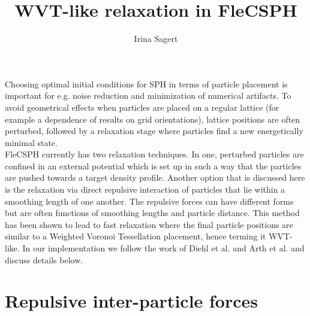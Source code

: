 \documentclass{article}
\begin{document}
\title{WVT-like relaxation in FleCSPH}
\author{Irina Sagert}

\maketitle

Choosing optimal initial conditions for SPH in terms of particle placement is important for e.g. noise reduction and minimization of numerical artifacts. 
To avoid geometrical effects when particles are placed on a regular lattice (for example a dependence of results on grid orientations), lattice positions are often perturbed, followed by a relaxation stage where particles find a new energetically minimal state. \\
FleCSPH currently has two relaxation techniques. 
In one, perturbed particles are confined in an external potential which is set up in such a way that the particles are pushed towards a target density profile.  
Another option that is discussed here is the relaxation via direct repulsive interaction of particles that lie within a smoothing length of one another. 
The repulsive forces can have different forms but are often functions of smoothing lengths and particle distance. 
This method has been shown to lead to fast relaxation where the final particle positions are similar to a  Weighted Voronoi Tessellation placement, hence terming it WVT-like.
In our implementation we follow the work of Diehl et al. \cite{Diehl15} and Arth et al. \cite{Arth19} and discuss details below. 
\section{Repulsive inter-particle forces}
\end{document}
